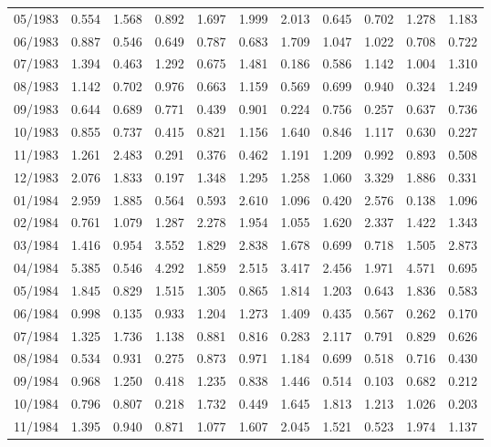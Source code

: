\begin{tabular}{lrrrrrrrrrr}
05/1983 &  0.554 &  1.568 &  0.892 &  1.697 &  1.999 &  2.013 &  0.645 &  0.702 &  1.278 &  1.183 \\
06/1983 &  0.887 &  0.546 &  0.649 &  0.787 &  0.683 &  1.709 &  1.047 &  1.022 &  0.708 &  0.722 \\
07/1983 &  1.394 &  0.463 &  1.292 &  0.675 &  1.481 &  0.186 &  0.586 &  1.142 &  1.004 &  1.310 \\
08/1983 &  1.142 &  0.702 &  0.976 &  0.663 &  1.159 &  0.569 &  0.699 &  0.940 &  0.324 &  1.249 \\
09/1983 &  0.644 &  0.689 &  0.771 &  0.439 &  0.901 &  0.224 &  0.756 &  0.257 &  0.637 &  0.736 \\
10/1983 &  0.855 &  0.737 &  0.415 &  0.821 &  1.156 &  1.640 &  0.846 &  1.117 &  0.630 &  0.227 \\
11/1983 &  1.261 &  2.483 &  0.291 &  0.376 &  0.462 &  1.191 &  1.209 &  0.992 &  0.893 &  0.508 \\
12/1983 &  2.076 &  1.833 &  0.197 &  1.348 &  1.295 &  1.258 &  1.060 &  3.329 &  1.886 &  0.331 \\
01/1984 &  2.959 &  1.885 &  0.564 &  0.593 &  2.610 &  1.096 &  0.420 &  2.576 &  0.138 &  1.096 \\
02/1984 &  0.761 &  1.079 &  1.287 &  2.278 &  1.954 &  1.055 &  1.620 &  2.337 &  1.422 &  1.343 \\
03/1984 &  1.416 &  0.954 &  3.552 &  1.829 &  2.838 &  1.678 &  0.699 &  0.718 &  1.505 &  2.873 \\
04/1984 &  5.385 &  0.546 &  4.292 &  1.859 &  2.515 &  3.417 &  2.456 &  1.971 &  4.571 &  0.695 \\
05/1984 &  1.845 &  0.829 &  1.515 &  1.305 &  0.865 &  1.814 &  1.203 &  0.643 &  1.836 &  0.583 \\
06/1984 &  0.998 &  0.135 &  0.933 &  1.204 &  1.273 &  1.409 &  0.435 &  0.567 &  0.262 &  0.170 \\
07/1984 &  1.325 &  1.736 &  1.138 &  0.881 &  0.816 &  0.283 &  2.117 &  0.791 &  0.829 &  0.626 \\
08/1984 &  0.534 &  0.931 &  0.275 &  0.873 &  0.971 &  1.184 &  0.699 &  0.518 &  0.716 &  0.430 \\
09/1984 &  0.968 &  1.250 &  0.418 &  1.235 &  0.838 &  1.446 &  0.514 &  0.103 &  0.682 &  0.212 \\
10/1984 &  0.796 &  0.807 &  0.218 &  1.732 &  0.449 &  1.645 &  1.813 &  1.213 &  1.026 &  0.203 \\
11/1984 &  1.395 &  0.940 &  0.871 &  1.077 &  1.607 &  2.045 &  1.521 &  0.523 &  1.974 &  1.137 \\

\end{tabular}
